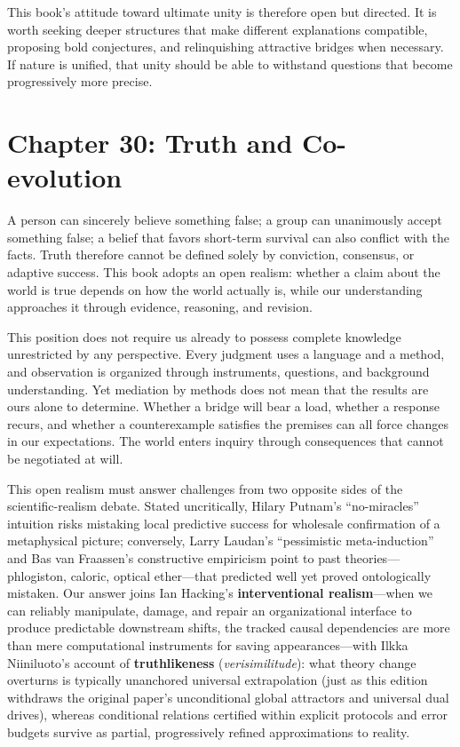 \documentclass[
  english,
  11pt,
  oneside]{book}
\begin{document}
\begingroup{}

This book's attitude toward ultimate unity is therefore open but directed. It is worth seeking deeper structures that make different explanations compatible, proposing bold conjectures, and relinquishing attractive bridges when necessary. If nature is unified, that unity should be able to withstand questions that become progressively more precise.

\par\endgroup

\chapter{Chapter 30: Truth and Co-evolution}\label{ph-ch-30}

A person can sincerely believe something false; a group can unanimously accept something false; a belief that favors short-term survival can also conflict with the facts. Truth therefore cannot be defined solely by conviction, consensus, or adaptive success. This book adopts an open realism: whether a claim about the world is true depends on how the world actually is, while our understanding approaches it through evidence, reasoning, and revision.

This position does not require us already to possess complete knowledge unrestricted by any perspective. Every judgment uses a language and a method, and observation is organized through instruments, questions, and background understanding. Yet mediation by methods does not mean that the results are ours alone to determine. Whether a bridge will bear a load, whether a response recurs, and whether a counterexample satisfies the premises can all force changes in our expectations. The world enters inquiry through consequences that cannot be negotiated at will.

This open realism must answer challenges from two opposite sides of the scientific-realism debate. Stated uncritically, Hilary Putnam's ``no-miracles'' intuition risks mistaking local predictive success for wholesale confirmation of a metaphysical picture; conversely, Larry Laudan's ``pessimistic meta-induction'' and Bas van Fraassen's constructive empiricism point to past theories---phlogiston, caloric, optical ether---that predicted well yet proved ontologically mistaken. Our answer joins Ian Hacking's \textbf{interventional realism}---when we can reliably manipulate, damage, and repair an organizational interface to produce predictable downstream shifts, the tracked causal dependencies are more than mere computational instruments for saving appearances---with Ilkka Niiniluoto's account of \textbf{truthlikeness} (\emph{verisimilitude}): what theory change overturns is typically unanchored universal extrapolation (just as this edition withdraws the original paper's unconditional global attractors and universal dual drives), whereas conditional relations certified within explicit protocols and error budgets survive as partial, progressively refined approximations to reality.
\end{document}
